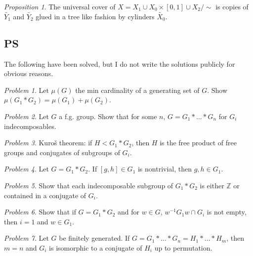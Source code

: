 \documentclass[11pt]{article}
\theoremstyle{definition}
\theoremstyle{example}
\theoremstyle{remark}
\theoremstyle{lemma}
\theoremstyle{proposition}
\newtheorem{proposition}{Proposition}[section]
\theoremstyle{Problem}
\newtheorem{problem}{Problem}[section]
\theoremstyle{Solution}
\theoremstyle{theorem}
\theoremstyle{corollary}
\begin{document}
\begin{proposition}
The universal cover of $X= X_1\cup X_0 \times [0,1] \cup X_2/\sim$ is copies of $\widetilde{Y_1}$ and $\widetilde{Y_2}$ glued in a tree like fashion by cylinders $\widetilde{X_0}$. 
\end{proposition}


\subsection{PS}
The following have been solved, but I do not write the solutions publicly for obvious reasons.
\begin{problem}
Let $\mu(G)$ the min cardinality of a generating set of $G$. Show $\mu(G_1*G_2) = \mu(G_1) + \mu(G_2)$.
\end{problem}


\begin{problem}
Let $G$ a f.g. group. Show that for some $n$, $G=G_1*...*G_n$ for $G_i$ indecomposables.
\end{problem}


\begin{problem}
Kuro\v{s} theorem: if $H < G_1*G_2$, then $H$ is the free product of free groups and conjugates of subgroups of $G_i$.
\end{problem}

\begin{problem}
Let $G= G_1*G_2$. If $[g,h]\in G_1$ is nontrivial, then $g,h\in G_1$.
\end{problem}

\begin{problem}
Show that each indecomposable subgroup of $G_1*G_2$ is either $\mathbb{Z}$ or contained in a conjugate of $G_i$.
\end{problem}


\begin{problem}
Show that if $G=G_1*G_2$ and for $w\in G$, $w^{-1}G_1w\cap G_i$ is not empty, then $i=1$ and $w\in G_1$.
\end{problem}


\begin{problem}
Let $G$ be finitely generated. If $G=G_1*...*G_n = H_1*...*H_m$, then $m=n$ and $G_i$ is isomorphic to a conjugate of $H_i$ up to permutation.
\end{problem}
\end{document}
